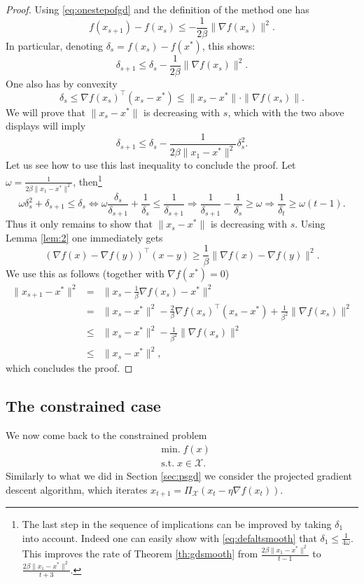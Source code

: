 \documentclass[openany]{now}
\newcommand{\cX}{\mathcal{X}}
\begin{document}
\begin{proof}
Using \eqref{eq:onestepofgd} and the definition of the method one has
$$f(x_{s+1}) - f(x_s) \leq - \frac{1}{2 \beta} \|\nabla f(x_s)\|^2.$$
In particular, denoting $\delta_s = f(x_s) - f(x^*)$, this shows:
$$\delta_{s+1} \leq \delta_s  - \frac{1}{2 \beta} \|\nabla f(x_s)\|^2.$$
One also has by convexity
$$\delta_s \leq \nabla f(x_s)^{\top} (x_s - x^*) \leq \|x_s - x^*\| \cdot \|\nabla f(x_s)\| .$$
We will prove that $\|x_s - x^*\|$ is decreasing with $s$, which with the two above displays will imply
$$\delta_{s+1} \leq \delta_s  - \frac{1}{2 \beta \|x_1 - x^*\|^2} \delta_s^2.$$
Let us see how to use this last inequality to conclude the proof. Let $\omega = \frac{1}{2 \beta \|x_1 - x^*\|^2}$, then\footnote{The last step in the sequence of implications can be improved by taking $\delta_1$ into account. Indeed one can easily show with \eqref{eq:defaltsmooth} that $\delta_1 \leq \frac{1}{4 \omega}$. This improves the rate of Theorem \ref{th:gdsmooth} from $\frac{2 \beta \|x_1 - x^*\|^2}{t-1}$ to $\frac{2 \beta \|x_1 - x^*\|^2}{t+3}$.}
$$\omega \delta_s^2 + \delta_{s+1} \leq \delta_s \Leftrightarrow \omega \frac{\delta_s}{\delta_{s+1}} + \frac{1}{\delta_{s}} \leq \frac{1}{\delta_{s+1}} \Rightarrow \frac{1}{\delta_{s+1}} - \frac{1}{\delta_{s}} \geq \omega \Rightarrow \frac{1}{\delta_t} \geq \omega (t-1) .$$
Thus it only remains to show that $\|x_s - x^*\|$ is decreasing with $s$. Using Lemma \ref{lem:2} one immediately gets
\begin{equation} \label{eq:coercive1}
(\nabla f(x) - \nabla f(y))^{\top} (x - y) \geq \frac{1}{\beta} \|\nabla f(x) - \nabla f(y)\|^2 .
\end{equation}
We use this as follows (together with $\nabla f(x^*) = 0$)
\begin{eqnarray*}
\|x_{s+1} - x^*\|^2& = & \|x_{s} - \frac{1}{\beta} \nabla f(x_s) - x^*\|^2 \\
& = & \|x_{s} - x^*\|^2 - \frac{2}{\beta} \nabla f(x_s)^{\top} (x_s - x^*) + \frac{1}{\beta^2} \|\nabla f(x_s)\|^2 \\
& \leq & \|x_{s} - x^*\|^2 - \frac{1}{\beta^2} \|\nabla f(x_s)\|^2 \\
& \leq & \|x_{s} - x^*\|^2 ,
\end{eqnarray*}
which concludes the proof.
\end{proof}

\subsection*{The constrained case}
We now come back to the constrained problem
\begin{align*}
& \mathrm{min.} \; f(x) \\
& \text{s.t.} \; x \in \cX .
\end{align*}
Similarly to what we did in Section \ref{sec:psgd} we consider the projected gradient descent algorithm, which iterates $x_{t+1} = \Pi_{\cX}(x_t - \eta \nabla f(x_t))$. 
\end{document}
